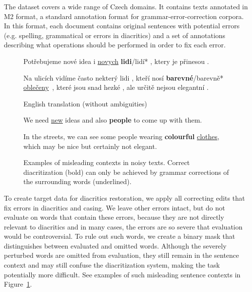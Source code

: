 \documentclass{pbmlarxiv}
\newenvironment{framedexample}{\begin{center}\begin{minipage}[c]{1\hsize}\setlength{\FrameSep}{5pt}\begin{framed}\setlength{\parskip}{4pt}}{\end{framed}\end{minipage}\end{center}}
\newcommand{\englishexamples}[1]{\begin{center}\small English translation #1\end{center}}
\begin{document}
The dataset covers a wide range of Czech domains. It contains texts annotated in M2 format, a standard annotation format for grammar-error-correction corpora. In this format, each document contains original sentences with potential errors (e.g. spelling, grammatical or errors in diacritics) and a set of annotations describing what operations should be performed in order to fix each error. 

\begin{figure}[t]
    \begin{framedexample}
        Potřebujeme nové idea i \uline{novych} \textbf{lidi}/lidí* , ktery je přinesou . 
        
        Na ulicích vidíme často nekterý lidi , kteří nosí \textbf{barevné}/barevně* \uline{oblečeny}~, které jsou snad hezké , ale určitě nejsou elegantní .
    \end{framedexample}
        
    \itshape
    
    \begin{framedexample}
        \englishexamples{(without ambiguities)}

        We need \uline{new} ideas and also \textbf{people} to come up with them.
        
        In the streets, we can see some people wearing \textbf{colourful} \uline{clothes}, which may be nice but certainly not elegant.
    \end{framedexample}
    \caption{Examples of misleading contexts in noisy texts. Correct diacritization (bold) can only be achieved by grammar corrections of the surrounding words (underlined).}
    \label{table:misleading_context}
\end{figure}

To create target data for diacritics restoration, we apply all correcting edits that fix errors in diacritics and casing. We leave other errors intact, but do not evaluate on words that contain these errors, because they are not directly relevant to diacritics and in many cases, the errors are so severe that evaluation would be controversial. To rule out such words, we create a binary mask that distinguishes between evaluated and omitted words. Although the severely perturbed words are omitted from evaluation, they still remain in the sentence context and may still confuse the diacritization system, making the task potentially more difficult. See examples of such misleading sentence contexts in Figure~\ref{table:misleading_context}.
\end{document}
